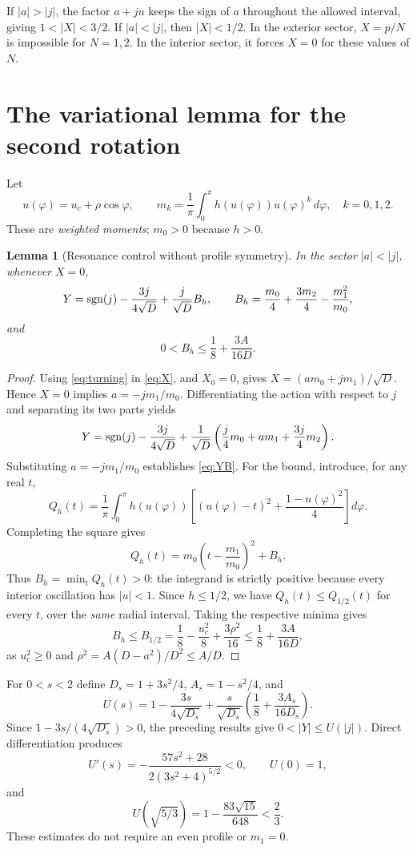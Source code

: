 \documentclass[11pt,a4paper]{article}
\newtheorem{lemma}[theorem]{Lemma}
\theoremstyle{remark}\newtheorem{remark}[theorem]{Remark}
\begin{document}
If $|a|>|j|$, the factor $a+ju$ keeps the sign of $a$ throughout the allowed interval, giving $1<|X|<3/2$. If $|a|<|j|$, then $|X|<1/2$. In the exterior sector, $X=p/N$ is impossible for $N=1,2$. In the interior sector, it forces $X=0$ for these values of $N$.

\section{The variational lemma for the second rotation}
Let
\[
u(\varphi)=u_c+\rho\cos\varphi,\qquad
m_k=\frac1\pi\int_0^\pi h(u(\varphi))u(\varphi)^k\,d\varphi,\quad k=0,1,2.
\]
These are \emph{weighted moments}; $m_0>0$ because $h>0$.

\begin{lemma}[Resonance control without profile symmetry]\label{lem:B}
In the sector $|a|<|j|$, whenever $X=0$,
\begin{equation}\label{eq:YB}
Y=\operatorname{sgn}(j)-\frac{3j}{4\sqrt D}+\frac{j}{\sqrt D}B_h,\qquad
B_h=\frac{m_0}{4}+\frac{3m_2}{4}-\frac{m_1^2}{m_0},
\end{equation}
and
\begin{equation}\label{eq:Bbound}
\boxed{0<B_h\le\frac18+\frac{3A}{16D}.}
\end{equation}
\end{lemma}
\begin{proof}
Using \eqref{eq:turning} in \eqref{eq:X}, and $X_0=0$, gives $X=(am_0+jm_1)/\sqrt D$. Hence $X=0$ implies $a=-jm_1/m_0$. Differentiating the action with respect to $j$ and separating its two parts yields
\[
Y=\operatorname{sgn}(j)-\frac{3j}{4\sqrt D}+\frac1{\sqrt D}\left(\frac j4m_0+am_1+\frac{3j}{4}m_2\right).
\]
Substituting $a=-jm_1/m_0$ establishes \eqref{eq:YB}. For the bound, introduce, for any real $t$,
\[
Q_h(t)=\frac1\pi\int_0^\pi h(u(\varphi))\left[(u(\varphi)-t)^2+\frac{1-u(\varphi)^2}{4}\right]d\varphi.
\]
Completing the square gives
\[
Q_h(t)=m_0\left(t-\frac{m_1}{m_0}\right)^2+B_h.
\]
Thus $B_h=\min_t Q_h(t)>0$: the integrand is strictly positive because every interior oscillation has $|u|<1$. Since $h\le1/2$, we have $Q_h(t)\le Q_{1/2}(t)$ for every $t$, over the \emph{same} radial interval. Taking the respective minima gives
\[
B_h\le B_{1/2}=\frac18-\frac{u_c^2}{8}+\frac{3\rho^2}{16}\le\frac18+\frac{3A}{16D},
\]
as $u_c^2\ge0$ and $\rho^2=A(D-a^2)/D^2\le A/D$.
\end{proof}

For $0<s<2$ define $D_s=1+3s^2/4$, $A_s=1-s^2/4$, and
\begin{equation}\label{eq:U}
U(s)=1-\frac{3s}{4\sqrt{D_s}}+\frac{s}{\sqrt{D_s}}\left(\frac18+\frac{3A_s}{16D_s}\right).
\end{equation}
Since $1-3s/(4\sqrt{D_s})>0$, the preceding results give $0<|Y|\le U(|j|)$. Direct differentiation produces
\begin{equation}\label{eq:Uprime}
U'(s)=-\frac{57s^2+28}{2(3s^2+4)^{5/2}}<0,\qquad U(0)=1,
\end{equation}
and
\begin{equation}\label{eq:Uthreshold}
U\left(\sqrt{5/3}\right)=1-\frac{83\sqrt{15}}{648}<\frac23.
\end{equation}
These estimates do not require an even profile or $m_1=0$.
\end{document}
